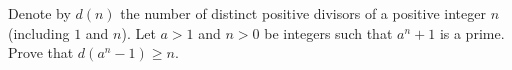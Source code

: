 Denote by $d(n)$ the number of distinct positive divisors of a positive integer $n$ (including $1$ and $n$). Let $a>1$ and $n>0$ be integers such that $a^n+1$ is a prime. Prove that $d(a^n-1)\ge n$.